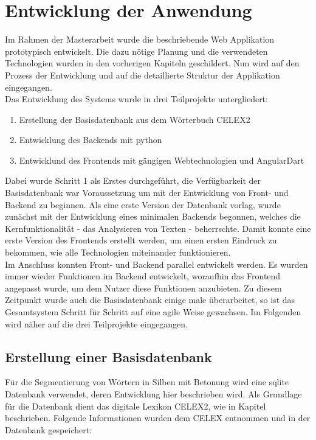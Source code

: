 
\chapter{Entwicklung der Anwendung}

Im Rahmen der Masterarbeit wurde die beschriebende Web Applikation prototypisch entwickelt. Die dazu nötige Planung und die verwendeten Technologien wurden in den vorherigen Kapiteln geschildert. Nun wird auf den Prozess der Entwicklung und auf die detaillierte Struktur der Applikation eingegangen.\\

Das Entwicklung des Systems wurde in drei Teilprojekte untergliedert:
\begin{enumerate}
	\item Erstellung der Basisdatenbank aus dem Wörterbuch CELEX2
	\item Entwicklung des Backends mit python
	\item Entwicklund des Frontends mit gängigen Webtechnologien und AngularDart
\end{enumerate}

Dabei wurde Schritt 1 als Erstes durchgeführt, die Verfügbarkeit der Basisdatenbank war Voraussetzung um mit der Entwicklung von Front- und Backend zu beginnen. Als eine erste Version der Datenbank vorlag, wurde zunächst mit der Entwicklung eines minimalen Backends begonnen, welches die Kernfunktionalität - das Analysieren von Texten - beherrschte. Damit konnte eine erste Version des Frontends erstellt werden, um einen ersten Eindruck zu bekommen, wie alle Technologien miteinander funktionieren.\\
Im Anschluss konnten Front- und Backend parallel entwickelt werden. Es wurden immer wieder Funktionen im Backend entwickelt, woraufhin das Frontend angepasst wurde, um dem Nutzer diese Funktionen anzubieten. Zu diesem Zeitpunkt wurde auch die Basisdatenbank einige male überarbeitet, so ist das Gesamtsystem Schritt für Schritt auf eine agile Weise  gewachsen. Im Folgenden wird näher auf die drei Teilprojekte eingegangen.

\section{Erstellung einer Basisdatenbank}
\label{sec:worddatabase}

Für die Segmentierung von Wörtern in Silben mit Betonung wird eine sqlite Datenbank verwendet, deren Entwicklung hier beschrieben wird. Als Grundlage für die Datenbank dient das digitale Lexikon  CELEX2, wie in Kapitel  beschrieben. Folgende Informationen wurden dem CELEX entnommen und in der Datenbank gespeichert:

